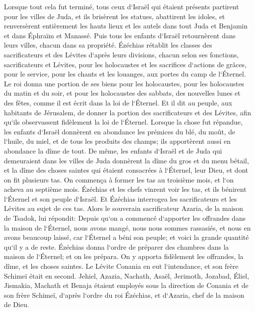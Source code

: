 \verse Lorsque tout cela fut terminé, tous ceux d`Israël qui étaient présents partirent pour les villes de Juda, et ils brisèrent les statues, abattirent les idoles, et renversèrent entièrement les hauts lieux et les autels dans tout Juda et Benjamin et dans Éphraïm et Manassé. Puis tous les enfants d`Israël retournèrent dans leurs villes, chacun dans sa propriété. 
\verse Ézéchias rétablit les classes des sacrificateurs et des Lévites d`après leurs divisions, chacun selon ses fonctions, sacrificateurs et Lévites, pour les holocaustes et les sacrifices d`actions de grâces, pour le service, pour les chants et les louanges, aux portes du camp de l`Éternel. 
\verse Le roi donna une portion de ses biens pour les holocaustes, pour les holocaustes du matin et du soir, et pour les holocaustes des sabbats, des nouvelles lunes et des fêtes, comme il est écrit dans la loi de l`Éternel. 
\verse Et il dit au peuple, aux habitants de Jérusalem, de donner la portion des sacrificateurs et des Lévites, afin qu`ils observassent fidèlement la loi de l`Éternel. 
\verse Lorsque la chose fut répandue, les enfants d`Israël donnèrent en abondance les prémices du blé, du moût, de l`huile, du miel, et de tous les produits des champs; ils apportèrent aussi en abondance la dîme de tout. 
\verse De même, les enfants d`Israël et de Juda qui demeuraient dans les villes de Juda donnèrent la dîme du gros et du menu bétail, et la dîme des choses saintes qui étaient consacrées à l`Éternel, leur Dieu, et dont on fit plusieurs tas. 
\verse On commença à former les tas au troisième mois, et l`on acheva au septième mois. 
\verse Ézéchias et les chefs vinrent voir les tas, et ils bénirent l`Éternel et son peuple d`Israël. 
\verse Et Ézéchias interrogea les sacrificateurs et les Lévites au sujet de ces tas. 
\verse Alors le souverain sacrificateur Azaria, de la maison de Tsadok, lui répondit: Depuis qu`on a commencé d`apporter les offrandes dans la maison de l`Éternel, nous avons mangé, nous nous sommes rassasiés, et nous en avons beaucoup laissé, car l`Éternel a béni son peuple; et voici la grande quantité qu`il y a de reste. 
\verse Ézéchias donna l`ordre de préparer des chambres dans la maison de l`Éternel; et on les prépara. 
\verse On y apporta fidèlement les offrandes, la dîme, et les choses saintes. Le Lévite Conania en eut l`intendance, et son frère Schimeï était en second. 
\verse Jehiel, Azazia, Nachath, Asaël, Jerimoth, Jozabad, Éliel, Jismakia, Machath et Benaja étaient employés sous la direction de Conania et de son frère Schimeï, d`après l`ordre du roi Ézéchias, et d`Azaria, chef de la maison de Dieu. 
